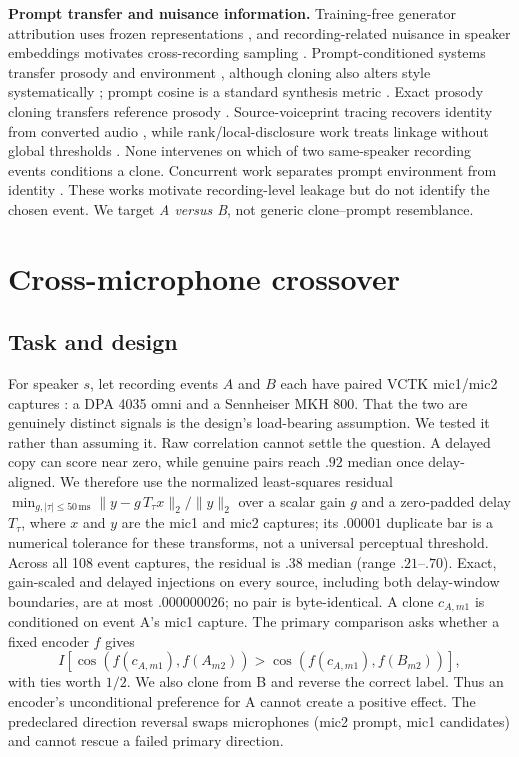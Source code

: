 \documentclass[10pt,twocolumn,letterpaper]{article}
\begin{document}
\textbf{Prompt transfer and nuisance information.} Training-free generator
attribution uses frozen representations \cite{tada2025,pirlogeanu2026}, and
recording-related nuisance in speaker embeddings motivates cross-recording
sampling \cite{ssps2025}. Prompt-conditioned systems transfer prosody and
environment \cite{restyletts2026,noiserobust2024}, although cloning
also alters style systematically \cite{stylecloning2026}; prompt cosine is a
standard synthesis metric \cite{simo}. Exact prosody
cloning transfers reference prosody \cite{prosodyclone2022}. Source-voiceprint
tracing recovers identity from converted audio \cite{sourcevoiceprint2023},
while rank/local-disclosure work treats linkage without global thresholds
\cite{rankdisclosure2026,sterns2026}. None intervenes on which of two
same-speaker recording events conditions a clone. Concurrent work separates
prompt environment from identity \cite{promptenv2026}. These works motivate
recording-level leakage but do not identify the chosen event. We target
\emph{A versus B}, not generic clone--prompt resemblance.

\section{Cross-microphone crossover}
\subsection{Task and design}
For speaker $s$, let recording events $A$ and $B$ each have paired VCTK
mic1/mic2 captures \cite{vctk}: a DPA 4035 omni and a Sennheiser MKH 800.
That the two are genuinely distinct signals is the design's load-bearing
assumption. We tested it rather than assuming it. Raw correlation cannot settle
the question. A delayed copy can score near zero, while genuine pairs reach $.92$ median
once delay-aligned. We therefore use the normalized least-squares residual
$\min_{g,|\tau|\le 50\,\mathrm{ms}}\|y-g\,T_\tau x\|_2/\|y\|_2$ over a scalar
gain $g$ and a zero-padded delay $T_\tau$, where $x$ and $y$ are the mic1 and
mic2 captures; its $.00001$ duplicate bar
is a numerical tolerance for these transforms, not a universal perceptual
threshold. Across all 108 event captures, the residual is $.38$ median
(range $.21$--$.70$). Exact, gain-scaled and delayed injections on every source,
including both delay-window boundaries, are at most $.000000026$; no pair is byte-identical. A clone $c_{A,m1}$ is conditioned on
event A's mic1 capture.
The primary comparison asks whether a fixed encoder $f$ gives
\begin{equation}
  I\!\left[\cos(f(c_{A,m1}),f(A_{m2}))>
              \cos(f(c_{A,m1}),f(B_{m2}))\right],
\end{equation}
with ties worth $1/2$. We also clone from B and reverse the correct label. Thus
an encoder's unconditional preference for A cannot create a positive effect.
The predeclared direction reversal swaps microphones (mic2 prompt, mic1 candidates)
and cannot rescue a failed primary direction.
\end{document}
